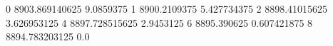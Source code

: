 0 8903.869140625 9.0859375
1 8900.2109375 5.427734375
2 8898.41015625 3.626953125
4 8897.728515625 2.9453125
6 8895.390625 0.607421875
8 8894.783203125 0.0
